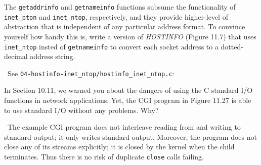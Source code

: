 \documentclass[12pt]{article}
\newenvironment{ex}[2][Exercise]{\begin{trivlist}
		\item[\hskip \labelsep {\bfseries #1}\hskip \labelsep {\bfseries #2.}]}{\end{trivlist}}
\newenvironment{sol}[1][Solution]{\begin{trivlist}
		\item[\hskip \labelsep {\bfseries #1:}]}{\end{trivlist}}
\begin{document}
\begin{ex}{11.4}
	The \texttt{getaddrinfo} and \texttt{getnameinfo} functions subsume the functionality of
	\texttt{inet\_pton} and \texttt{inet\_ntop}, respectively, and they provide higher-level
	of abstraction that is independent of any particular address format. To convince yourself
	how handy this is, write a version of \emph{HOSTINFO} (Figure 11.7) that uses
	\texttt{inet\_ntop} insted of \texttt{getnameinfo} to convert each socket address to a
	dotted-decimal address string.
\end{ex}

\begin{sol}
	\
	See \texttt{04-hostinfo-inet\_ntop/hostinfo\_inet\_ntop.c}:
	
\end{sol}

\begin{ex}{11.5}
	In Section 10.11, we warned you about the dangers of using the C standard I/O functions in
	network applications. Yet, the CGI program in Figure 11.27 is able to use standard I/O
	without any problems. Why?
\end{ex}

\begin{sol}
	\
	The example CGI program does not interleave reading from and writing to standard output;
	it only writes standard output. Moreover, the program does not close any of its streams
	explicitly; it is closed by the kernel when the child terminates. Thus there is no risk
	of duplicate \texttt{close} calls failing.
\end{sol}
\end{document}
